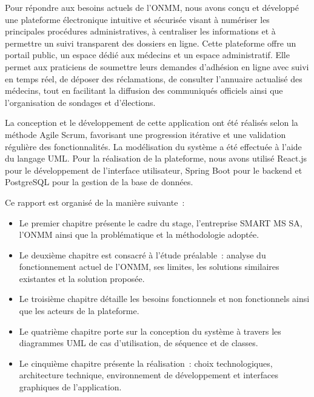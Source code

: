 ﻿\documentclass[12pt,a4paper]{report}
\begin{document}
Pour répondre aux besoins actuels de l’ONMM, nous avons conçu et développé une plateforme électronique intuitive et sécurisée visant à numériser les principales procédures administratives, à centraliser les informations et à permettre un suivi transparent des dossiers en ligne. Cette plateforme offre un portail public, un espace dédié aux médecins et un espace administratif. Elle permet aux praticiens de soumettre leurs demandes d’adhésion en ligne avec suivi en temps réel, de déposer des réclamations, de consulter l’annuaire actualisé des médecins, tout en facilitant la diffusion des communiqués officiels ainsi que l’organisation de sondages et d’élections.

La conception et le développement de cette application ont été réalisés selon la méthode Agile Scrum, favorisant une progression itérative et une validation régulière des fonctionnalités. La modélisation du système a été effectuée à l'aide du langage UML. Pour la réalisation de la plateforme, nous avons utilisé React.js pour le développement de l'interface utilisateur, Spring Boot pour le backend et PostgreSQL pour la gestion de la base de données.

Ce rapport est organisé de la manière suivante~:

\begin{itemize}
    \item Le premier chapitre présente le cadre du stage, l'entreprise
    SMART MS SA, l'ONMM ainsi que la problématique et la méthodologie adoptée.

    \item Le deuxième chapitre est consacré à l'étude préalable~: analyse
    du fonctionnement actuel de l'ONMM, ses limites, les solutions similaires
    existantes et la solution proposée.

    \item Le troisième chapitre détaille les besoins fonctionnels et non
    fonctionnels ainsi que les acteurs de la plateforme.

    \item Le quatrième chapitre porte sur la conception du système à travers
    les diagrammes UML de cas d'utilisation, de séquence et de classes.

    \item Le cinquième chapitre présente la réalisation~: choix technologiques,
    architecture technique, environnement de développement et interfaces
    graphiques de l'application.
\end{itemize}
\end{document}
